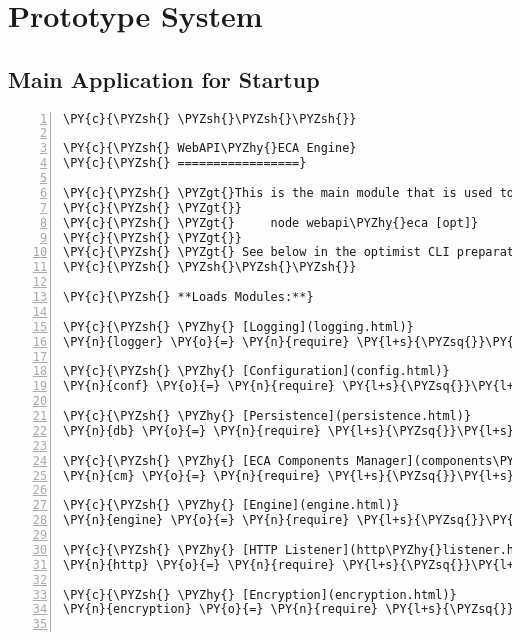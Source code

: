 
\chapter{Prototype System}

\section{Main Application for Startup}

\begin{Verbatim}[fontsize=\scriptsize,commandchars=\\\{\},numbers=left,firstnumber=1,stepnumber=1]
\PY{c}{\PYZsh{} \PYZsh{}\PYZsh{}\PYZsh{}}

\PY{c}{\PYZsh{} WebAPI\PYZhy{}ECA Engine}
\PY{c}{\PYZsh{} =================}

\PY{c}{\PYZsh{} \PYZgt{}This is the main module that is used to run the whole application:}
\PY{c}{\PYZsh{} \PYZgt{}}
\PY{c}{\PYZsh{} \PYZgt{}     node webapi\PYZhy{}eca [opt]}
\PY{c}{\PYZsh{} \PYZgt{}}
\PY{c}{\PYZsh{} \PYZgt{} See below in the optimist CLI preparation for allowed optional parameters `[opt]`.}
\PY{c}{\PYZsh{} \PYZsh{}\PYZsh{}\PYZsh{}}

\PY{c}{\PYZsh{} **Loads Modules:**}

\PY{c}{\PYZsh{} \PYZhy{} [Logging](logging.html)}
\PY{n}{logger} \PY{o}{=} \PY{n}{require} \PY{l+s}{\PYZsq{}}\PY{l+s}{./logging}\PY{l+s}{\PYZsq{}}

\PY{c}{\PYZsh{} \PYZhy{} [Configuration](config.html)}
\PY{n}{conf} \PY{o}{=} \PY{n}{require} \PY{l+s}{\PYZsq{}}\PY{l+s}{./config}\PY{l+s}{\PYZsq{}}

\PY{c}{\PYZsh{} \PYZhy{} [Persistence](persistence.html)}
\PY{n}{db} \PY{o}{=} \PY{n}{require} \PY{l+s}{\PYZsq{}}\PY{l+s}{./persistence}\PY{l+s}{\PYZsq{}}

\PY{c}{\PYZsh{} \PYZhy{} [ECA Components Manager](components\PYZhy{}manager.html)}
\PY{n}{cm} \PY{o}{=} \PY{n}{require} \PY{l+s}{\PYZsq{}}\PY{l+s}{./components\PYZhy{}manager}\PY{l+s}{\PYZsq{}}

\PY{c}{\PYZsh{} \PYZhy{} [Engine](engine.html)}
\PY{n}{engine} \PY{o}{=} \PY{n}{require} \PY{l+s}{\PYZsq{}}\PY{l+s}{./engine}\PY{l+s}{\PYZsq{}}

\PY{c}{\PYZsh{} \PYZhy{} [HTTP Listener](http\PYZhy{}listener.html)}
\PY{n}{http} \PY{o}{=} \PY{n}{require} \PY{l+s}{\PYZsq{}}\PY{l+s}{./http\PYZhy{}listener}\PY{l+s}{\PYZsq{}}

\PY{c}{\PYZsh{} \PYZhy{} [Encryption](encryption.html)}
\PY{n}{encryption} \PY{o}{=} \PY{n}{require} \PY{l+s}{\PYZsq{}}\PY{l+s}{./encryption}\PY{l+s}{\PYZsq{}}


\end{Verbatim}
